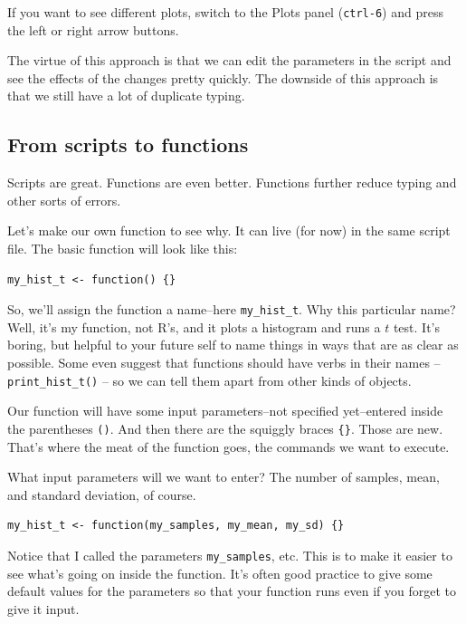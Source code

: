 \documentclass[]{article}
\begin{document}
If you want to see different plots, switch to the Plots panel
(\texttt{ctrl-6}) and press the left or right arrow buttons.

The virtue of this approach is that we can edit the parameters in the
script and see the effects of the changes pretty quickly. The downside
of this approach is that we still have a lot of duplicate typing.

\subsection{From scripts to functions}\label{from-scripts-to-functions}

Scripts are great. Functions are even better. Functions further reduce
typing and other sorts of errors.

Let's make our own function to see why. It can live (for now) in the
same script file. The basic function will look like this:

\begin{verbatim}
my_hist_t <- function() {}
\end{verbatim}

So, we'll assign the function a name--here \texttt{my\_hist\_t}. Why
this particular name? Well, it's my function, not R's, and it plots a
histogram and runs a \(t\) test. It's boring, but helpful to your future
self to name things in ways that are as clear as possible. Some even
suggest that functions should have verbs in their names --
\texttt{print\_hist\_t()} -- so we can tell them apart from other kinds
of objects.

Our function will have some input parameters--not specified yet--entered
inside the parentheses \texttt{()}. And then there are the squiggly
braces \texttt{\{\}}. Those are new. That's where the meat of the
function goes, the commands we want to execute.

What input parameters will we want to enter? The number of samples,
mean, and standard deviation, of course.

\begin{verbatim}
my_hist_t <- function(my_samples, my_mean, my_sd) {}
\end{verbatim}

Notice that I called the parameters \texttt{my\_samples}, etc. This is
to make it easier to see what's going on inside the function. It's often
good practice to give some default values for the parameters so that
your function runs even if you forget to give it input.
\end{document}

